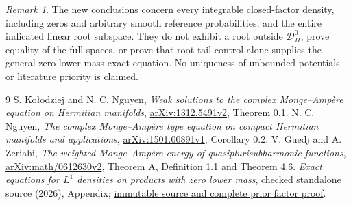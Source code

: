 \documentclass[11pt]{article}
\theoremstyle{remark}\newtheorem{remark}[theorem]{Remark}
\begin{document}
\begin{remark}
The new conclusions concern every integrable closed-factor density,
including zeros and arbitrary smooth reference probabilities, and the
entire indicated linear root subspace. They do not exhibit a root
outside $\mathcal D_H^0$, prove equality of the full spaces, or prove
that root-tail control alone supplies the general zero-lower-mass
exact equation. No uniqueness of unbounded potentials or literature
priority is claimed.
\end{remark}
\begin{thebibliography}{9}
 S. Ko\l odziej and N. C. Nguyen,
\emph{Weak solutions to the complex Monge--Amp\`ere equation on
Hermitian manifolds}, \href{https://arxiv.org/abs/1312.5491v2}{arXiv:1312.5491v2}, Theorem 0.1.
 N. C. Nguyen,
\emph{The complex Monge--Amp\`ere type equation on compact Hermitian
manifolds and applications},
\href{https://arxiv.org/abs/1501.00891v1}{arXiv:1501.00891v1}, Corollary 0.2.
 V. Guedj and A. Zeriahi,
\emph{The weighted Monge--Amp\`ere energy of quasiplurisubharmonic
functions}, \href{https://arxiv.org/abs/math/0612630v2}{arXiv:math/0612630v2},
Theorem A, Definition 1.1 and Theorem 4.6.
 \emph{Exact equations for $L^1$ densities on products
with zero lower mass}, checked standalone source (2026), Appendix;
\href{https://github.com/MingchenXia/non-kahler-pluripotential-theory/blob/7a244bc4938c5b918f7d906c7201f9385e4188f4/research/papers/P07-zero-lower-mass-product-equations.tex}{immutable source and complete prior factor proof}.
\end{thebibliography}
\end{document}
